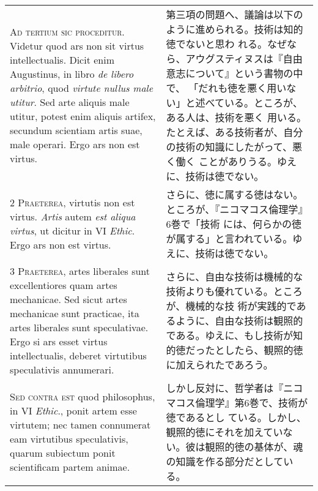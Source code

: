 \documentclass[10pt]{jsarticle}
\begin{document}
\begin{longtable}{p{21em}p{21em}}

{\huge A}{\scshape d tertium sic proceditur}. Videtur quod ars non sit
 virtus intellectualis. Dicit enim Augustinus, in libro {\itshape de
 libero arbitrio}, quod {\itshape virtute nullus male utitur}. Sed
 arte aliquis male utitur, potest enim aliquis artifex, secundum
 scientiam artis suae, male operari. Ergo ars non est virtus.

&

第三項の問題へ、議論は以下のように進められる。技術は知的徳でないと思わ
れる。なぜなら、アウグスティヌスは『自由意志について』という書物の中で、
「だれも徳を悪く用いない」と述べている。ところが、ある人は、技術を悪く
用いる。たとえば、ある技術者が、自分の技術の知識にしたがって、悪く働く
ことがありうる。ゆえに、技術は徳でない。

\\

{\scshape 2 Praeterea}, virtutis non est virtus. {\itshape Artis}
autem {\itshape est aliqua virtus}, ut dicitur in VI {\itshape
Ethic}. Ergo ars non est virtus.

&

さらに、徳に属する徳はない。ところが、『ニコマコス倫理学』6巻で「技術
には、何らかの徳が属する」と言われている。ゆえに、技術は徳でない。

\\

{\scshape 3 Praeterea}, artes liberales sunt excellentiores quam artes
mechanicae. Sed sicut artes mechanicae sunt practicae, ita artes
liberales sunt speculativae. Ergo si ars esset virtus intellectualis,
deberet virtutibus speculativis annumerari.

&

さらに、自由な技術は機械的な技術よりも優れている。ところが、機械的な技
術が実践的であるように、自由な技術は観照的である。ゆえに、もし技術が知
的徳だったとしたら、観照的徳に加えられたであろう。

\\

{\scshape Sed contra est} quod philosophus, in VI {\itshape Ethic}.,
ponit artem esse virtutem; nec tamen connumerat eam virtutibus
speculativis, quarum subiectum ponit scientificam partem animae.

&

しかし反対に、哲学者は『ニコマコス倫理学』第6巻で、技術が徳であるとし
ている。しかし、観照的徳にそれを加えていない。彼は観照的徳の基体が、魂
の知識を作る部分だとしている。


\end{longtable}
\end{document}
